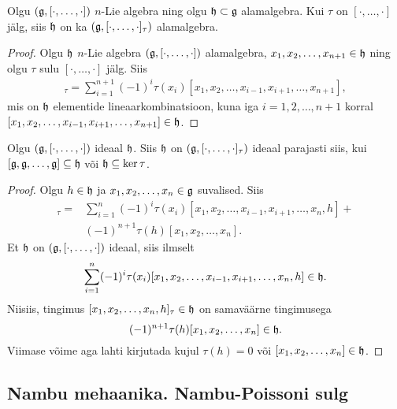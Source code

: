 \begin{lau}
    Olgu $(\mathfrak{g}, [\cdot, \dots, \cdot])$ $n$-Lie algebra ning olgu
    $\mathfrak{h} \subset \mathfrak{g}$ alamalgebra. Kui $\tau$ on $[\cdot, \dots, \cdot]$ jälg,
    siis $\mathfrak{h}$ on ka $(\mathfrak{g}, [\cdot, \dots, \cdot]_\tau)$ alamalgebra.
\end{lau}

\begin{proof}
    Olgu $\mathfrak{h}$ $n$-Lie algebra $(\mathfrak{g}, [\cdot, \dots, \cdot])$ alamalgebra,
    $x_1, x_2, \dots, x_{n+1} \in \mathfrak{h}$ ning olgu $\tau$ sulu
    $[\cdot, \dots, \cdot]$ jälg. Siis
    \begin{align*}
        [x_1, x_2, \dots, x_{n+1}]_\tau =  \sum_{i=1}^{n+1} (-1)^i \tau(x_i)
        [x_1, x_2, \dots, x_{i-1}, x_{i+1}, \dots, x_{n+1}],
    \end{align*}
    mis on $\mathfrak{h}$ elementide lineaarkombinatsioon, kuna iga
    $i = 1, 2, \dots, n+1$ korral
    $[x_1, x_2, \dots, x_{i-1}, x_{i+1}, \dots, x_{n+1}] \in \mathfrak{h}$.
\end{proof}

\begin{lau}
    Olgu $(\mathfrak{g}, [\cdot, \dots, \cdot])$ ideaal $\mathfrak{h}$. Siis $\mathfrak{h}$ on
    $(\mathfrak{g}, [\cdot, \dots, \cdot]_\tau)$ ideaal parajasti siis, kui
    $[\mathfrak{g}, \mathfrak{g}, \dots, \mathfrak{g}] \subseteq \mathfrak{h}$ või $\mathfrak{h} \subseteq \ker \tau$.
\end{lau}

\begin{proof}
    Olgu $h \in \mathfrak{h}$ ja $x_1, x_2, \dots, x_n \in \mathfrak{g}$ suvalised. Siis
    \begin{align*}
        [x_1, x_2, \dots, x_n, h]_\tau =  &\sum_{i=1}^{n} (-1)^i \tau(x_i)
        [x_1, x_2, \dots, x_{i-1}, x_{i+1}, \dots, x_n, h] + \\
        &(-1)^{n+1} \tau(h) [x_1, x_2, \dots, x_n].
    \end{align*}
    Et $\mathfrak{h}$ on $(\mathfrak{g}, [\cdot, \dots, \cdot])$ ideaal, siis ilmselt
    \begin{align*}
        \sum_{i=1}^{n} (-1)^i \tau(x_i)
        [x_1, x_2, \dots, x_{i-1}, x_{i+1}, \dots, x_n, h] \in \mathfrak{h}.
    \end{align*}
    Niisiis, tingimus $[x_1, x_2, \dots, x_n, h]_\tau \in \mathfrak{h}$ on
    samaväärne tingimusega
    \[ (-1)^{n+1} \tau(h) [x_1, x_2, \dots, x_n] \in \mathfrak{h}. \]
    Viimase võime aga lahti kirjutada kujul
    $\tau(h) = 0$ või $[x_1, x_2, \dots, x_n] \in \mathfrak{h}$.
\end{proof}

\subsection{Nambu mehaanika. Nambu-Poissoni sulg}

